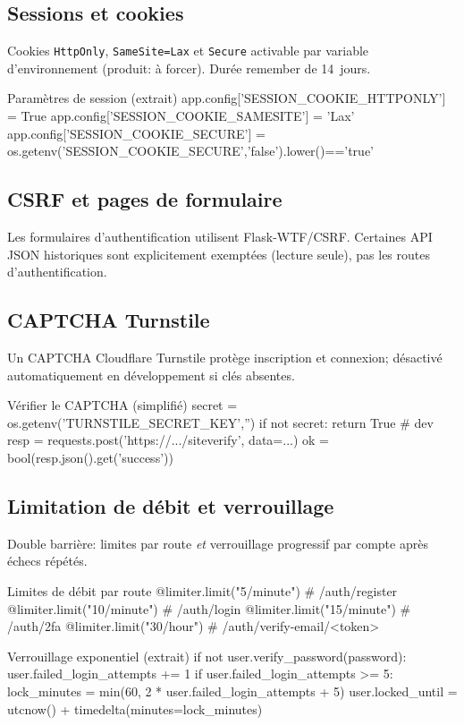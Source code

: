 \subsection*{Sessions et cookies}
\noindent Cookies \texttt{HttpOnly}, \texttt{SameSite=Lax} et \texttt{Secure} activable par variable d'environnement (produit: à forcer). Durée \og remember \fg{} de 14~jours.
\begin{codebox}[language=Python]{Paramètres de session (extrait)}
app.config['SESSION_COOKIE_HTTPONLY'] = True
app.config['SESSION_COOKIE_SAMESITE'] = 'Lax'
app.config['SESSION_COOKIE_SECURE'] = os.getenv('SESSION_COOKIE_SECURE','false').lower()=='true'
\end{codebox}

\subsection*{CSRF et pages de formulaire}
\noindent Les formulaires d'authentification utilisent Flask-WTF/CSRF. Certaines API JSON historiques sont explicitement exemptées (lecture seule), pas les routes d'authentification.

\subsection*{CAPTCHA Turnstile}
\noindent Un CAPTCHA Cloudflare Turnstile protège inscription et connexion; désactivé automatiquement en développement si clés absentes.
\begin{codebox}[language=Python]{Vérifier le CAPTCHA (simplifié)}
secret = os.getenv('TURNSTILE_SECRET_KEY','')
if not secret: return True  # dev
resp = requests.post('https://.../siteverify', data={...})
ok = bool(resp.json().get('success'))
\end{codebox}

\subsection*{Limitation de débit et verrouillage}
\noindent Double barrière: limites par route \emph{et} verrouillage progressif par compte après échecs répétés.
\begin{codebox}[language=Python]{Limites de débit par route}
@limiter.limit("5/minute")  # /auth/register
@limiter.limit("10/minute") # /auth/login
@limiter.limit("15/minute") # /auth/2fa
@limiter.limit("30/hour")   # /auth/verify-email/<token>
\end{codebox}

\begin{codebox}[language=Python]{Verrouillage exponentiel (extrait)}
if not user.verify_password(password):
    user.failed_login_attempts += 1
    if user.failed_login_attempts >= 5:
        lock_minutes = min(60, 2 * user.failed_login_attempts + 5)
        user.locked_until = utcnow() + timedelta(minutes=lock_minutes)
\end{codebox}

